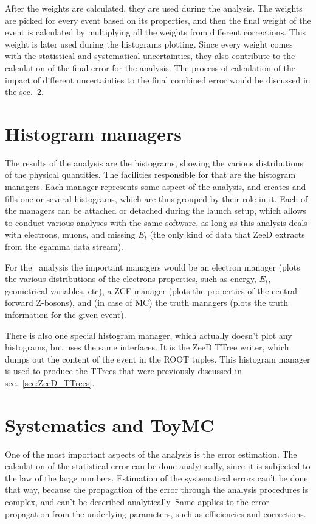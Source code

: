 After the weights are calculated, they are used during the analysis. The weights are picked for every event based on its properties, and then the final weight of the event is calculated by multiplying all the weights from different corrections. This weight is later used during the histograms plotting. Since every weight comes with the statistical and systematical uncertainties, they also contribute to the calculation of the final error for the analysis. The process of calculation of the impact of different uncertainties to the final combined error would be discussed in the sec.~\ref{sec:ZeeD_toymc}.

\section{Histogram managers}

The results of the analysis are the histograms, showing the various distributions of the physical quantities. The facilities responsible for that are the histogram managers. Each manager represents some aspect of the analysis, and creates and fills one or several histograms, which are thus grouped by their role in it. Each of the managers can be attached or detached during the launch setup, which allows to conduct various analyses with the same software, as long as this analysis deals with electrons, muons, and missing $E_{t}$ (the only kind of data that ZeeD extracts from the egamma data stream).

For the \Zee\ analysis the important managers would be an electron manager (plots the various distributions of the electrons properties, such as energy, $E_{t}$, geometrical variables, etc), a ZCF manager (plots the properties of the central-forward Z-bosons), and (in case of MC) the truth managers (plots the truth information for the given event).

There is also one special histogram manager, which actually doesn't plot any histograms, but uses the same interfaces. It is the ZeeD TTree writer, which dumps out the content of the event in the ROOT tuples. This histogram manager is used to produce the TTrees that were previously discussed in sec.~\ref{sec:ZeeD_TTrees}.

\section{Systematics and ToyMC}
\label{sec:ZeeD_toymc}

One of the most important aspects of the analysis is the error estimation. The calculation of the statistical error can be done analytically, since it is subjected to the law of the large numbers. Estimation of the systematical errors can't be done that way, because the propagation of the error through the analysis procedures is complex, and can't be described analytically. Same applies to the error propagation from the underlying parameters, such as efficiencies and corrections.

